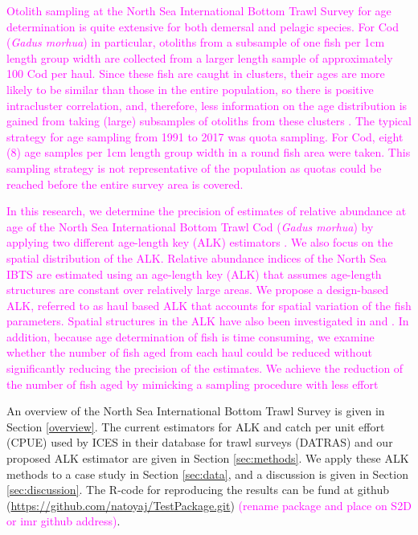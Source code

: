 \documentclass[a4paper 12pt]{article}
\numberwithin{equation}{section}
\newcommand{\natty}[1]{\textcolor{magenta}{#1}}
\begin{document}
\natty{ Otolith sampling at the North Sea International Bottom Trawl Survey for age determination is quite extensive for both demersal and pelagic species. For  Cod (\textit{Gadus morhua}) in particular, otoliths from a subsample of one fish per 1cm length group width are collected from a larger length sample of approximately 100 Cod per haul. Since these fish are caught in clusters, their ages are more likely to be similar than those in the entire population, so there is positive intracluster correlation, and, therefore, less information on the age distribution is gained from taking (large) subsamples of otoliths from these clusters \citep{pennington1994assessing,aanes2015efficient}. The typical strategy for age sampling from 1991 to 2017 was quota sampling. For Cod, eight (8) age samples per 1cm length group width in a round fish area were taken. This sampling strategy is not representative of the population as quotas could be reached before the entire survey area is covered. } 

\natty{In this research, we determine the precision of estimates of relative abundance at age of the North Sea International Bottom Trawl Cod (\textit{Gadus morhua}) by applying two different age-length key (ALK) estimators \citep{fridriksson1934calculation}. We also focus on the spatial distribution of the ALK. Relative abundance indices of the North Sea IBTS are estimated using an age-length key (ALK) that assumes age-length structures are constant over relatively large areas. We propose a design-based ALK, referred to as haul based ALK that accounts for spatial variation \natty{of the fish parameters}. Spatial structures in the ALK have also been investigated in \citet{berg2012spatial} and  \citet{hirst2012bayesian}. In addition, because age determination of fish is time consuming, we examine whether the number of fish aged from each haul could be reduced without significantly reducing the
precision of the estimates. We achieve the reduction of the number of fish aged by mimicking a sampling procedure with less effort } 

An  overview of the  North Sea International Bottom Trawl Survey is given in Section \ref{overview}. The current estimators for ALK and catch per unit effort (CPUE) used by ICES in their database for trawl surveys (DATRAS) and our proposed ALK estimator are given in Section \ref{sec:methods}. We apply these ALK methods to a case study in Section  \ref{sec:data}, and a discussion is given in Section \ref{sec:discussion}. The R-code for reproducing the results can be fund at github (\href{https://github.com/natoyaj/TestPackage.git}{https://github.com/natoyaj/TestPackage.git}) \natty{(rename package and place on S2D or imr github address)}.
 
\end{document}
